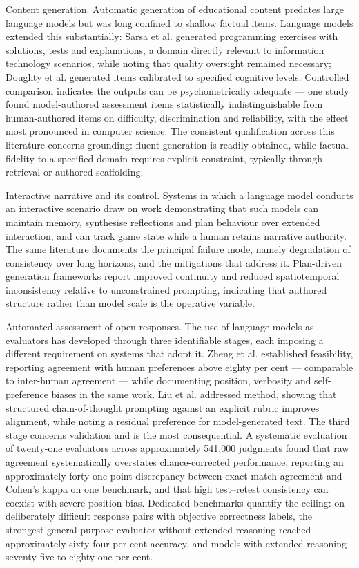 Content generation. Automatic generation of educational content predates large language models but was long confined to shallow factual items\cite{r48}. Language models extended this substantially: Sarsa et al.\cite{r49} generated programming exercises with solutions, tests and explanations, a domain directly relevant to information technology scenarios, while noting that quality oversight remained necessary; Doughty et al.\cite{r50} generated items calibrated to specified cognitive levels. Controlled comparison indicates the outputs can be psychometrically adequate --- one study found model-authored assessment items statistically indistinguishable from human-authored items on difficulty, discrimination and reliability, with the effect most pronounced in computer science\cite{r51}. The consistent qualification across this literature concerns grounding: fluent generation is readily obtained, while factual fidelity to a specified domain requires explicit constraint, typically through retrieval or authored scaffolding\cite{r52}.

Interactive narrative and its control. Systems in which a language model conducts an interactive scenario draw on work demonstrating that such models can maintain memory, synthesise reflections and plan behaviour over extended interaction\cite{r53}, and can track game state while a human retains narrative authority\cite{r54,r55}. The same literature documents the principal failure mode, namely degradation of consistency over long horizons, and the mitigations that address it. Plan-driven generation frameworks report improved continuity and reduced spatiotemporal inconsistency relative to unconstrained prompting\cite{r56}, indicating that authored structure rather than model scale is the operative variable.

Automated assessment of open responses. The use of language models as evaluators has developed through three identifiable stages, each imposing a different requirement on systems that adopt it. Zheng et al.\cite{r57} established feasibility, reporting agreement with human preferences above eighty per cent --- comparable to inter-human agreement --- while documenting position, verbosity and self-preference biases in the same work. Liu et al.\cite{r58} addressed method, showing that structured chain-of-thought prompting against an explicit rubric improves alignment, while noting a residual preference for model-generated text. The third stage concerns validation and is the most consequential. A systematic evaluation of twenty-one evaluators across approximately 541,000 judgments\cite{r59} found that raw agreement systematically overstates chance-corrected performance, reporting an approximately forty-one point discrepancy between exact-match agreement and Cohen's kappa on one benchmark, and that high test--retest consistency can coexist with severe position bias. Dedicated benchmarks quantify the ceiling: on deliberately difficult response pairs with objective correctness labels, the strongest general-purpose evaluator without extended reasoning reached approximately sixty-four per cent accuracy, and models with extended reasoning seventy-five to eighty-one per cent\cite{r60}.

